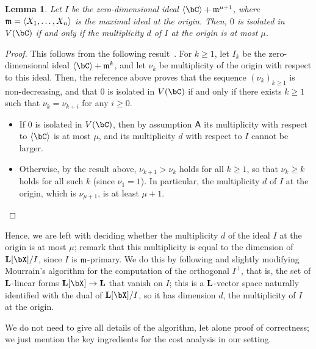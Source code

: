 \documentclass[12pt]{article}
\newtheorem{lemma}[definition]{Lemma}
\begin{document}
\begin{lemma}
  Let $I$ be the zero-dimensional ideal
  $\langle \bC \rangle + \m^{\mu+1}$, where
  $\mathfrak{m}=\langle X_1,\dots,X_n\rangle$ is the maximal ideal at the
  origin. Then, $0$ is isolated in $V(\bC)$ if and only if the
  multiplicity $d$ of $I$ at the origin is at most $\mu$.
\end{lemma}
\begin{proof}
  This follows from the following
  result~\cite[Theorem~A.1]{BaHaPeSo09}.  For $k \ge 1$, let $I_k$ be
  the zero-dimensional ideal $\langle \bC \rangle + \m^{k}$, and let
  $\nu_k$ be multiplicity of the origin with respect to this
  ideal. Then, the reference above proves that the sequence
  $(\nu_k)_{k \ge 1}$ is non-decreasing, and that $0$ is isolated in
  $V(\bC)$ if and only if there exists $k\ge 1$ such that
  $\nu_k=\nu_{k+i}$ for any $i\geq 0$.
  \begin{itemize}
  \item If $0$ is isolated in $V(\bC)$, then by assumption $\mathsf{A}$ 
    its multiplicity with respect to $\langle \bC\rangle$ is at most $\mu$,
    and its multiplicity $d$ with respect to $I$ cannot be larger.
  \item Otherwise, by the result above, $\nu_{k+1} > \nu_k$ holds for
    all $k \ge 1$, so that $\nu_k \ge k$ holds for all such $k$ (since
    $\nu_1=1$). In particular, the multiplicity $d$ of 
 $I$ at the origin, which is $\nu_{\mu+1}$, is at least $\mu+1$.
    \qedhere
  \end{itemize}
\end{proof}

Hence, we are left with deciding whether the multiplicity $d$ of the
ideal $I$ at the origin is at most $\mu$; remark that this
multiplicity is equal to the dimension of $\LL[\bX]/I$, since $I$ is
$\mathfrak{m}$-primary.  We do this by following and slightly modifying
Mourrain's algorithm for the computation of the orthogonal
$I^{\perp}$, that is, the set of $\mathbf{L}$-linear forms $\LL[\bX] \to \LL$
that vanish on $I$; this is a $\mathbf{L}$-vector space naturally identified
with the dual of $\LL[\bX]/I$, so it has dimension $d$, the
multiplicity of $I$ at the origin.

We do not need to give all details of the algorithm, let alone proof
of correctness; we just mention the key ingredients for the cost
analysis in our setting. 

\end{document}
